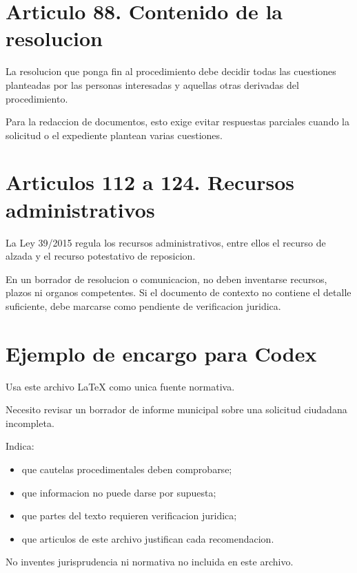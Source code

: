 \documentclass[a4paper,12pt]{article}
\begin{document}
\section*{Articulo 88. Contenido de la resolucion}

La resolucion que ponga fin al procedimiento debe decidir todas las cuestiones planteadas por las personas interesadas y aquellas otras derivadas del procedimiento.

Para la redaccion de documentos, esto exige evitar respuestas parciales cuando la solicitud o el expediente plantean varias cuestiones.

\section*{Articulos 112 a 124. Recursos administrativos}

La Ley 39/2015 regula los recursos administrativos, entre ellos el recurso de alzada y el recurso potestativo de reposicion.

En un borrador de resolucion o comunicacion, no deben inventarse recursos, plazos ni organos competentes. Si el documento de contexto no contiene el detalle suficiente, debe marcarse como pendiente de verificacion juridica.

\section*{Ejemplo de encargo para Codex}

Usa este archivo LaTeX como unica fuente normativa.

Necesito revisar un borrador de informe municipal sobre una solicitud ciudadana incompleta.

Indica:
\begin{itemize}
    \item que cautelas procedimentales deben comprobarse;
    \item que informacion no puede darse por supuesta;
    \item que partes del texto requieren verificacion juridica;
    \item que articulos de este archivo justifican cada recomendacion.
\end{itemize}

No inventes jurisprudencia ni normativa no incluida en este archivo.
\end{document}
